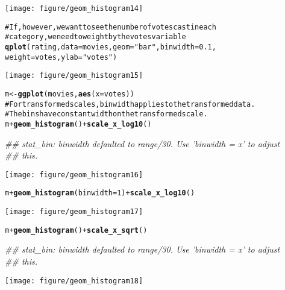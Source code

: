 \documentclass[a4paper,titlepage]{tufte-handout}\usepackage{graphicx, color}
\makeatletter
\def\maxwidth{ %
  \ifdim\Gin@nat@width>\linewidth
    \linewidth
  \else
    \Gin@nat@width
  \fi
}
\newcommand{\hlfunctioncall}[1]{\textcolor[rgb]{0.501960784313725,0,0.329411764705882}{\textbf{#1}}}%
\newcommand{\hlstring}[1]{\textcolor[rgb]{0.6,0.6,1}{#1}}%
\newcommand{\hlcomment}[1]{\textcolor[rgb]{0.180392156862745,0.6,0.341176470588235}{#1}}%
\newenvironment{kframe}{%
 \def\at@end@of@kframe{}%
 \ifinner\ifhmode%
  \def\at@end@of@kframe{\end{minipage}}%
  \begin{minipage}{\columnwidth}%
 \fi\fi%
 \def\FrameCommand##1{\hskip\@totalleftmargin \hskip-\fboxsep
 \colorbox{shadecolor}{##1}\hskip-\fboxsep
     \hskip-\linewidth \hskip-\@totalleftmargin \hskip\columnwidth}%
 \MakeFramed {\advance\hsize-\width
   \@totalleftmargin\z@ \linewidth\hsize
   \@setminipage}}%
 {\par\unskip\endMakeFramed%
 \at@end@of@kframe}
\newenvironment{knitrout}{}{} %
\makeatother
\begin{document}
\begin{knitrout}
\begin{kframe}
\begin{alltt}
\end{alltt}
\end{kframe}\texttt{[image: figure/geom\_histogram14]} \begin{kframe}\begin{alltt}
\hlcomment{# If, however, we want to see the number of votes cast in each}
\hlcomment{# category, we need to weight by the votes variable}
\hlfunctioncall{qplot}(rating, data=movies, geom=\hlstring{"bar"}, binwidth = 0.1,
  weight=votes, ylab = \hlstring{"votes"})
\end{alltt}
\end{kframe}\texttt{[image: figure/geom\_histogram15]} \begin{kframe}\begin{alltt}
m <- \hlfunctioncall{ggplot}(movies, \hlfunctioncall{aes}(x = votes))
\hlcomment{# For transformed scales, binwidth applies to the transformed data.}
\hlcomment{# The bins have constant width on the transformed scale.}
m + \hlfunctioncall{geom_histogram}() + \hlfunctioncall{scale_x_log10}()
\end{alltt}
\begin{flushleft}\ttfamily\noindent\itshape\textcolor{messagecolor}{\#\# stat\_bin: binwidth defaulted to range/30. Use 'binwidth = x' to adjust \\ 
\#\# this.}\end{flushleft}\end{kframe}\texttt{[image: figure/geom\_histogram16]} \begin{kframe}\begin{alltt}
m + \hlfunctioncall{geom_histogram}(binwidth = 1) + \hlfunctioncall{scale_x_log10}()
\end{alltt}
\end{kframe}\texttt{[image: figure/geom\_histogram17]} \begin{kframe}\begin{alltt}
m + \hlfunctioncall{geom_histogram}() + \hlfunctioncall{scale_x_sqrt}()
\end{alltt}
\begin{flushleft}\ttfamily\noindent\itshape\textcolor{messagecolor}{\#\# stat\_bin: binwidth defaulted to range/30. Use 'binwidth = x' to adjust \\ 
\#\# this.}\end{flushleft}\end{kframe}\texttt{[image: figure/geom\_histogram18]} \begin{kframe}\begin{alltt}

\end{alltt}
\end{kframe}
\end{knitrout}
\end{document}
